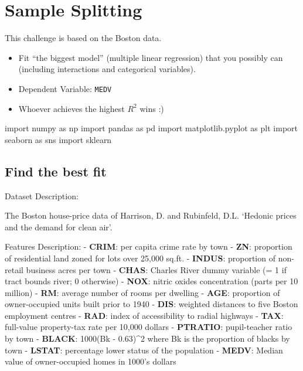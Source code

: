 \documentclass[
  letterpaper,
  DIV=11,
  numbers=noendperiod]{scrreprt}
\newenvironment{Shaded}{\begin{snugshade}}{\end{snugshade}}
\newcommand{\ImportTok}[1]{\textcolor[rgb]{0.00,0.46,0.62}{#1}}
\newcommand{\NormalTok}[1]{\textcolor[rgb]{0.00,0.23,0.31}{#1}}
\begin{document}

\hypertarget{sample-splitting}{%
\chapter{Sample Splitting}\label{sample-splitting}}

This challenge is based on the Boston data.

\begin{itemize}
\item
  Fit ``the biggest model'' (multiple linear regression) that you
  possibly can (including interactions and categorical variables).
\item
  Dependent Variable: \texttt{MEDV}
\item
  Whoever achieves the highest \(R^2\) wins :)
\end{itemize}

\begin{Shaded}
\begin{Highlighting}[]
\ImportTok{import}\NormalTok{ numpy }\ImportTok{as}\NormalTok{ np}
\ImportTok{import}\NormalTok{ pandas }\ImportTok{as}\NormalTok{ pd}
\ImportTok{import}\NormalTok{ matplotlib.pyplot }\ImportTok{as}\NormalTok{ plt}
\ImportTok{import}\NormalTok{ seaborn }\ImportTok{as}\NormalTok{ sns}
\ImportTok{import}\NormalTok{ sklearn}
\end{Highlighting}
\end{Shaded}

\hypertarget{find-the-best-fit}{%
\section{Find the best fit}\label{find-the-best-fit}}

Dataset Description:

The Boston house-price data of Harrison, D. and Rubinfeld, D.L. `Hedonic
prices and the demand for clean air'.

Features Description: - \textbf{CRIM}: per capita crime rate by town -
\textbf{ZN}: proportion of residential land zoned for lots over 25,000
sq.ft. - \textbf{INDUS}: proportion of non-retail business acres per
town - \textbf{CHAS}: Charles River dummy variable (= 1 if tract bounds
river; 0 otherwise) - \textbf{NOX}: nitric oxides concentration (parts
per 10 million) - \textbf{RM}: average number of rooms per dwelling -
\textbf{AGE}: proportion of owner-occupied units built prior to 1940 -
\textbf{DIS}: weighted distances to five Boston employment centres -
\textbf{RAD}: index of accessibility to radial highways - \textbf{TAX}:
full-value property-tax rate per 10,000 dollars - \textbf{PTRATIO}:
pupil-teacher ratio by town - \textbf{BLACK}: 1000(Bk - 0.63)\^{}2 where
Bk is the proportion of blacks by town - \textbf{LSTAT}: percentage
lower status of the population - \textbf{MEDV}: Median value of
owner-occupied homes in 1000's dollars
\end{document}
